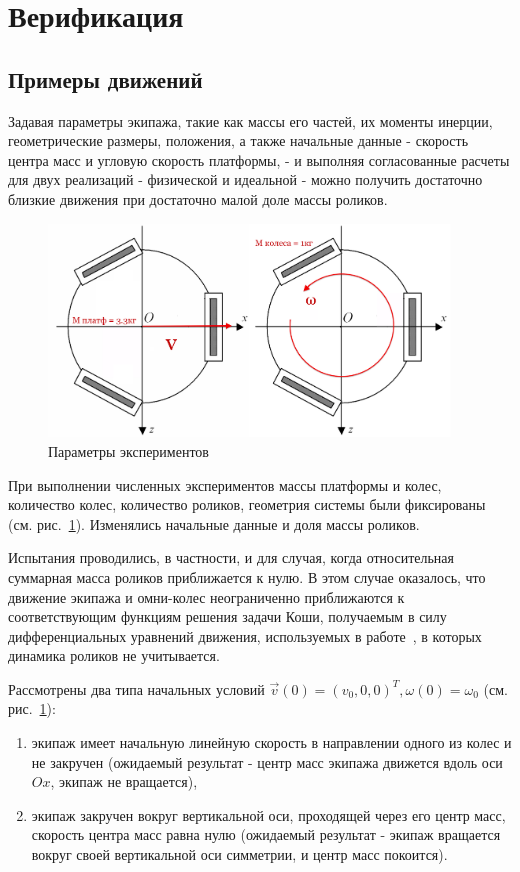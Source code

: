 \section{Верификация}

\subsection{Примеры движений}
Задавая параметры экипажа, такие как массы его частей, их моменты инерции, геометрические размеры, положения, а также начальные данные - скорость центра масс и угловую скорость платформы, - и выполняя согласованные расчеты для двух реализаций - физической и идеальной - можно получить достаточно близкие движения при достаточно малой доле массы роликов.

\begin{figure}[!ht]
    \centering
    \includegraphics[width=0.95\textwidth]{content/parts/3_friction/diploma/img/art/my_exp_setup.png}
    \caption{Параметры экспериментов}
    \label{fig:my_exp_setup}
\end{figure}

При выполнении численных экспериментов массы платформы и колес, количество колес, количество роликов, геометрия системы были фиксированы (см. рис.~\ref{fig:my_exp_setup}). Изменялись начальные данные и доля массы роликов.

Испытания проводились, в частности, и для случая, когда относительная суммарная масса роликов приближается к нулю. В этом случае оказалось, что движение экипажа и омни-колес неограниченно приближаются к соответствующим функциям решения задачи Коши, получаемым в силу дифференциальных уравнений движения, используемых в работе~\cite{Borisov2011}, в которых динамика роликов не учитывается.

Рассмотрены два типа начальных условий $\vec{v}(0) = (v_0, 0, 0)^T, \omega(0) = \omega_0$ (см. рис.~\ref{fig:my_exp_setup}):
\begin{enumerate}
\item экипаж имеет начальную линейную скорость в направлении одного из колес и не закручен (ожидаемый результат - центр масс экипажа движется вдоль оси $Ox$, экипаж не вращается),
\item экипаж закручен вокруг вертикальной оси, проходящей через его центр масс, скорость центра масс равна нулю (ожидаемый результат - экипаж вращается вокруг своей вертикальной оси симметрии, и центр масс покоится).
\end{enumerate}

